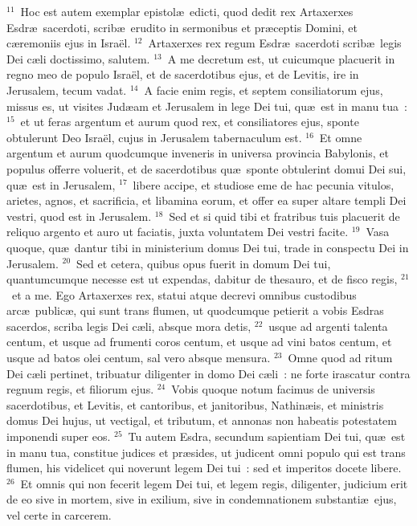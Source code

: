 ${}^{11}$~Hoc est autem exemplar epistol\ae\ edicti, quod dedit rex Artaxerxes Esdr\ae\ sacerdoti, scrib\ae\ erudito in sermonibus et pr\ae ceptis Domini, et c\ae remoniis ejus in Isra\"el.
${}^{12}$~Artaxerxes rex regum Esdr\ae\ sacerdoti scrib\ae\ legis Dei c\ae li doctissimo, salutem.
${}^{13}$~A me decretum est, ut cuicumque placuerit in regno meo de populo Isra\"el, et de sacerdotibus ejus, et de Levitis, ire in Jerusalem, tecum vadat.
${}^{14}$~A facie enim regis, et septem consiliatorum ejus, missus es, ut visites Jud\ae am et Jerusalem in lege Dei tui, qu\ae\ est in manu tua~:
${}^{15}$~et ut feras argentum et aurum quod rex, et consiliatores ejus, sponte obtulerunt Deo Isra\"el, cujus in Jerusalem tabernaculum est.
${}^{16}$~Et omne argentum et aurum quodcumque inveneris in universa provincia Babylonis, et populus offerre voluerit, et de sacerdotibus qu\ae\ sponte obtulerint domui Dei sui, qu\ae\ est in Jerusalem,
${}^{17}$~libere accipe, et studiose eme de hac pecunia vitulos, arietes, agnos, et sacrificia, et libamina eorum, et offer ea super altare templi Dei vestri, quod est in Jerusalem.
${}^{18}$~Sed et si quid tibi et fratribus tuis placuerit de reliquo argento et auro ut faciatis, juxta voluntatem Dei vestri facite.
${}^{19}$~Vasa quoque, qu\ae\ dantur tibi in ministerium domus Dei tui, trade in conspectu Dei in Jerusalem.
${}^{20}$~Sed et cetera, quibus opus fuerit in domum Dei tui, quantumcumque necesse est ut expendas, dabitur de thesauro, et de fisco regis,
${}^{21}$~et a me. Ego Artaxerxes rex, statui atque decrevi omnibus custodibus arc\ae\ public\ae , qui sunt trans flumen, ut quodcumque petierit a vobis Esdras sacerdos, scriba legis Dei c\ae li, absque mora detis,
${}^{22}$~usque ad argenti talenta centum, et usque ad frumenti coros centum, et usque ad vini batos centum, et usque ad batos olei centum, sal vero absque mensura.
${}^{23}$~Omne quod ad ritum Dei c\ae li pertinet, tribuatur diligenter in domo Dei c\ae li~: ne forte irascatur contra regnum regis, et filiorum ejus.
${}^{24}$~Vobis quoque notum facimus de universis sacerdotibus, et Levitis, et cantoribus, et janitoribus, Nathin\ae is, et ministris domus Dei hujus, ut vectigal, et tributum, et annonas non habeatis potestatem imponendi super eos.
${}^{25}$~Tu autem Esdra, secundum sapientiam Dei tui, qu\ae\ est in manu tua, constitue judices et pr\ae sides, ut judicent omni populo qui est trans flumen, his videlicet qui noverunt legem Dei tui~: sed et imperitos docete libere.
${}^{26}$~Et omnis qui non fecerit legem Dei tui, et legem regis, diligenter, judicium erit de eo sive in mortem, sive in exilium, sive in condemnationem substanti\ae\ ejus, vel certe in carcerem.


